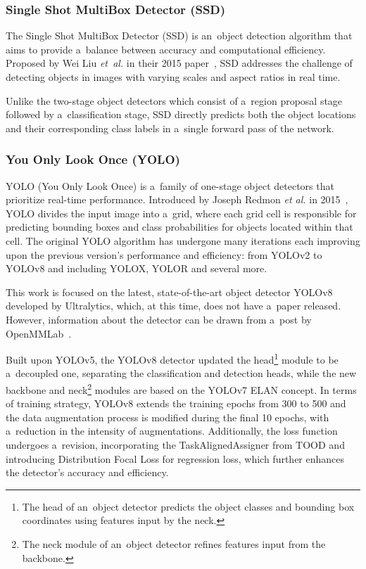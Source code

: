 \subsubsection{Single Shot MultiBox Detector (SSD)}

The Single Shot MultiBox Detector (SSD) is an~object detection algorithm that
aims to provide a~balance between accuracy and computational efficiency.
Proposed by Wei Liu \textit{et~al.} in their 2015 paper~\cite{Liu2015}, SSD
addresses the challenge of detecting objects in images with varying scales and
aspect ratios in real time.

Unlike the two-stage object detectors which consist of a~region proposal stage
followed by a~classification stage, SSD directly predicts both the object
locations and their corresponding class labels in a~single forward pass of the
network.


\subsubsection{You Only Look Once (YOLO)}

YOLO (You Only Look Once) is a~family of one-stage object detectors that
prioritize real-time performance. Introduced by Joseph Redmon \textit{et al.} in
2015~\cite{Redmon2015}, YOLO divides the input image into a~grid, where each
grid cell is responsible for predicting bounding boxes and class probabilities
for objects located within that cell. The original YOLO algorithm has undergone
many iterations each improving upon the previous version's performance and
efficiency: from YOLOv2 to YOLOv8 and including YOLOX, YOLOR and several more.

This work is focused on the latest, state-of-the-art object detector
YOLOv8~\cite{YOLOv8} developed by Ultralytics, which, at this time, does not have
a~paper released. However, information about the detector can be drawn from
a~post by OpenMMLab~\cite{YOLOv8OpenMMLab}.

Built upon YOLOv5, the YOLOv8 detector updated the head\footnote{The head of
an~object detector predicts the object classes and bounding box coordinates
using features input by the neck.} module to be a~decoupled one, separating the
classification and detection heads, while the new backbone and neck\footnote{The
neck module of an~object detector refines features input from the backbone.}
modules are based on the YOLOv7 ELAN concept. In terms of training strategy,
YOLOv8 extends the training epochs from 300 to 500 and the data augmentation
process is modified during the final 10 epochs, with a~reduction in the
intensity of augmentations. Additionally, the loss function undergoes
a~revision, incorporating the TaskAlignedAssigner from TOOD and introducing
Distribution Focal Loss for regression loss, which further enhances the
detector's accuracy and efficiency.


